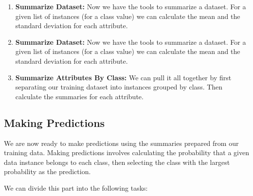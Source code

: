 {\begin{enumerate}
\item \textbf{Summarize Dataset:} Now we have the tools to summarize a dataset. For a given list of instances (for a class value) we can calculate the mean and the standard deviation for each attribute.

\item \textbf{Summarize Dataset:} Now we have the tools to summarize a dataset. For a given list of instances (for a class value) we can calculate the mean and the standard deviation for each attribute.

\item \textbf{Summarize Attributes By Class:} We can pull it all together by first separating our training dataset into instances grouped by class. Then calculate the summaries for each attribute. 


\end{enumerate}

}

\subsection{Making Predictions}
We are now ready to make predictions using the summaries prepared from our training data. Making predictions involves calculating the probability that a given data instance belongs to each class, then selecting the class with the largest probability as the prediction.

We can divide this part into the following tasks:

